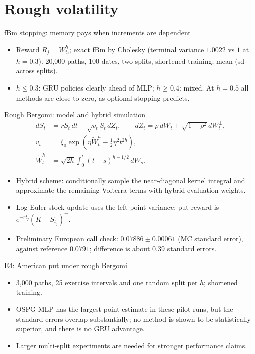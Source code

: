 \section{Rough volatility}

\begin{frame}{fBm stopping: memory pays when increments are dependent}
\centering\tiny
\resizebox{.9\linewidth}{!}{}
\vspace{4pt}
\begin{itemize}\scriptsize
\item Reward $R_j=W^h_{t_j}$; exact fBm by Cholesky (terminal variance $1.0022$ vs $1$ at $h=0.3$).
  20,000 paths, 100 dates, two splits, shortened training; mean (sd across splits).
\item $h\le0.3$: GRU policies clearly ahead of MLP; $h\ge0.4$: mixed. At $h=0.5$ all methods
  are close to zero, as optional stopping predicts.
\end{itemize}
\end{frame}

\begin{frame}{Rough Bergomi: model and hybrid simulation}
\small
\begin{align*}
 dS_t &= rS_t\,dt+\sqrt{v_t}S_t\,dZ_t,\qquad
 dZ_t=\rho\,dW_t+\sqrt{1-\rho^2}\,dW_t^\perp,\\
 v_t &=\xi_0\exp\!\left(\eta\widetilde W_t^h-\tfrac12\eta^2t^{2h}\right),\\
 \widetilde W_t^h&=\sqrt{2h}\int_0^t(t-s)^{h-1/2}\,dW_s.
\end{align*}
\begin{itemize}
\item Hybrid scheme: conditionally sample the near-diagonal kernel integral and approximate
  the remaining Volterra terms with hybrid evaluation weights.
\item Log-Euler stock update uses the left-point variance; put reward is
  $e^{-rt_j}(K-S_{t_j})^+$.
\item Preliminary European call check: $0.07886\pm0.00061$ (MC standard error),
  against reference $0.0791$; difference is about 0.39 standard errors.
\end{itemize}
\end{frame}

\begin{frame}{E4: American put under rough Bergomi}
\centering\scriptsize

\vspace{5pt}
\begin{itemize}\small
\item 3,000 paths, 25 exercise intervals and one random split per $h$; shortened training.
\item OSPG-MLP has the largest point estimate in these pilot runs, but the standard errors
  overlap substantially; no method is shown to be statistically superior, and there is no
  GRU advantage.
\item Larger multi-split experiments are needed for stronger performance claims.
\end{itemize}
\end{frame}
